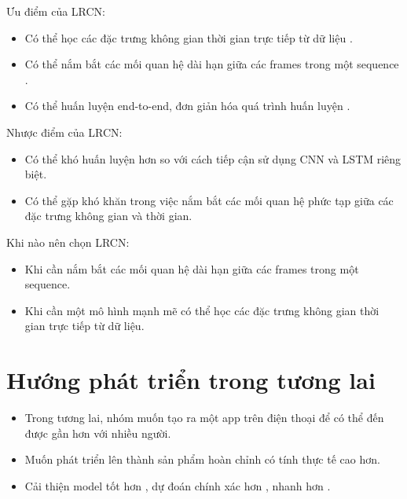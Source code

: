 Ưu điểm của LRCN:
\begin{itemize}
    \item Có thể học các đặc trưng không gian thời gian trực tiếp từ dữ liệu .
    \item Có thể nắm bắt các mối quan hệ dài hạn giữa các frames trong một sequence .
    \item Có thể huấn luyện end-to-end, đơn giản hóa quá trình huấn luyện .
\end{itemize}

Nhược điểm của LRCN:

\begin{itemize}
    \item Có thể khó huấn luyện hơn so với cách tiếp cận sử dụng CNN và LSTM riêng biệt.
    \item Có thể gặp khó khăn trong việc nắm bắt các mối quan hệ phức tạp giữa các đặc trưng không gian và thời gian.
\end{itemize}


Khi nào nên chọn LRCN:
\begin{itemize}
    \item Khi cần nắm bắt các mối quan hệ dài hạn giữa các frames trong một sequence.
    \item Khi cần một mô hình mạnh mẽ có thể học các đặc trưng không gian thời gian trực tiếp từ dữ liệu.
\end{itemize}



\section{Hướng phát triển trong tương lai}

\begin{itemize}
	\item Trong tương lai, nhóm muốn tạo ra một app trên điện thoại để có thể đến được gần hơn với nhiều người. 
	
	\item Muốn phát triển lên thành sản phẩm hoàn chỉnh có tính thực tế cao hơn.	
	
	\item Cải thiện model tốt hơn , dự đoán chính xác hơn , nhanh hơn . 
\end{itemize}




